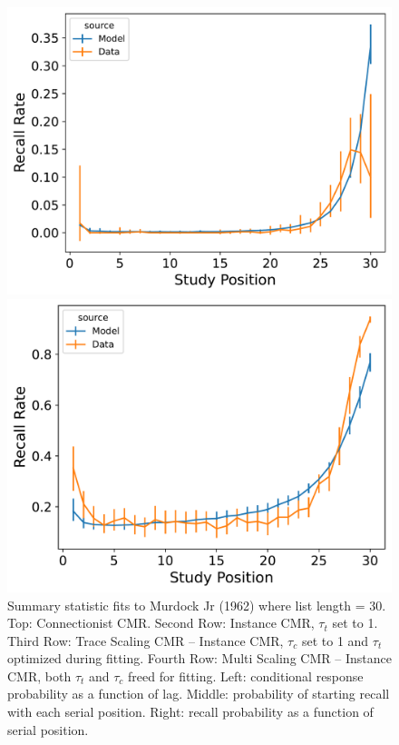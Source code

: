\documentclass[
  letterpaper,
  11pt,
  english,
  singlespacing,
  headsepline]{MastersDoctoralThesis}
\begin{document}
\begin{figure}
\begin{minipage}{0.33\linewidth}
\includegraphics{icmr_figures/Murdock1962_MultiScalingCMR_Model_Fitting_LL30_pnr-1.png}\end{minipage}%
%
\begin{minipage}{0.33\linewidth}
\includegraphics{icmr_figures/Murdock1962_MultiScalingCMR_Model_Fitting_LL30_spc-1.png}\end{minipage}%

\caption{\label{fig-murdock1962memory30}Summary statistic fits to
Murdock Jr (1962) where list length = 30. Top: Connectionist CMR. Second
Row: Instance CMR, \(\tau_{t}\) set to 1. Third Row: Trace Scaling CMR
-- Instance CMR, \(\tau_{c}\) set to 1 and \(\tau_{t}\) optimized during
fitting. Fourth Row: Multi Scaling CMR -- Instance CMR, both \(\tau_t\)
and \(\tau_c\) freed for fitting. Left: conditional response probability
as a function of lag. Middle: probability of starting recall with each
serial position. Right: recall probability as a function of serial
position.}

\end{figure}%
\end{document}
